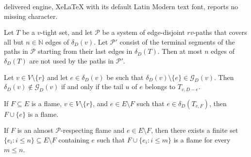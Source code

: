 \documentclass[10pt,a4paper]{amsart}
\begin{document}
delivered engine, XeLaTeX with its default Latin Modern text font, reports no missing character.
\begin{corollary}\label{cor: at most n}
Let $T$ be a $v$-tight set, and let $\mathcal{P}$ be a system of edge-disjoint $rv$-paths that covers all but $n\in\mathbb{N}$ edges of 
$\delta_D(v)$.
Let $\mathcal{P}'$ consist of the terminal segments of the paths in $\mathcal{P}$ starting from their last edges in $\delta_D(T)$.
Then at most $n$ edges of $\delta_D(T)$ are not used by the paths in $\mathcal{P}'$.
\end{corollary}

\begin{lemma}\label{lem: char no single}
Let $v\in V\setminus\{r\}$ and let $e\in\delta_D(v)$ be such that
$\delta_D(v)\setminus\{e\}\in\mathcal{G}_D(v)$.
Then $\delta_D(v)\notin\mathcal{G}_D(v)$ if and only if the tail $u$ of $e$ belongs to $T_{v,D-e}$.
\end{lemma}

\begin{corollary}\label{cor: insert one}
If $F\subseteq E$ is a flame, $v\in V\setminus\{r\}$, and $e\in E\setminus F$ such that
$e\in \delta_D(T_{v,F})$, then $F\cup\{e\}$ is a flame.
\end{corollary}

\begin{lemma}\label{lem: add fin}
If $F$ is an almost $\mathcal{P}$-respecting flame and $e\in E\setminus F$, then there
exists a finite set $\{e_i : i\leq n\}\subseteq E\setminus F$ containing $e$ such that
$F\cup\{e_i : i\leq m\}$ is a flame for every $m\leq n$.
\end{lemma}
\end{document}
